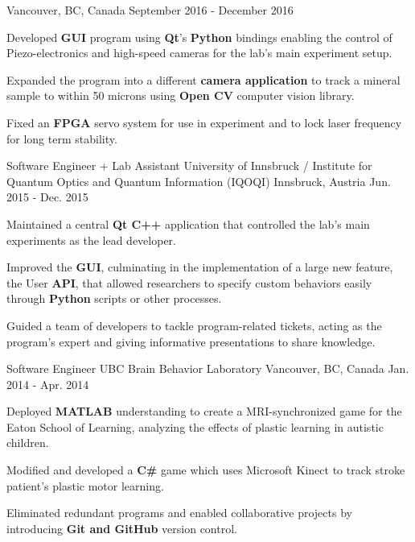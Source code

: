 \begin{cventries}
    {Vancouver, BC, Canada}
    {September 2016 - December 2016}
    {
      \begin{cvitems}
        \item {Developed \textbf{GUI} program using \textbf{Qt}’s \textbf{Python} bindings enabling the control of Piezo-electronics and high-speed
        cameras for the lab’s main experiment setup.}
        \item Expanded the program into a different \textbf{camera application} to track a mineral sample to within 50 microns using
        \textbf{Open CV} computer vision library.
        \item Fixed an \textbf{FPGA} servo system for use in experiment and to lock laser frequency for long term stability.
      \end{cvitems}
    }
  \cventry
    {Software Engineer + Lab Assistant}
    {University of Innsbruck / Institute for Quantum
    Optics and Quantum Information (IQOQI)}
    {Innsbruck, Austria}
    {Jun. 2015 - Dec. 2015}
    {
      \begin{cvitems}
        \item Maintained a central \textbf{Qt C++} application that controlled the lab’s main experiments as the lead developer.
        \item Improved the \textbf{GUI}, culminating in the implementation of a large new feature, the User \textbf{API}, that allowed
        researchers to specify custom behaviors easily through \textbf{Python} scripts or other processes.
        \item Guided a team of developers to tackle program-related tickets, acting as the program’s expert and giving
        informative presentations to share knowledge.
      \end{cvitems} 
    }
  
  \cventry
    {Software Engineer}
    {UBC Brain Behavior Laboratory}
    {Vancouver, BC, Canada}
    {Jan. 2014 - Apr. 2014}
    {
      \begin{cvitems}
        \item Deployed \textbf{MATLAB} understanding to create a MRI-synchronized game for the Eaton School of Learning,
        analyzing the effects of plastic learning in autistic children.
        \item Modified and developed a \textbf{C\#} game which uses Microsoft Kinect to track stroke patient’s plastic motor learning.
        \item Eliminated redundant programs and enabled collaborative projects by introducing \textbf{Git and GitHub} version control.
      \end{cvitems}
    }
\end{cventries}

